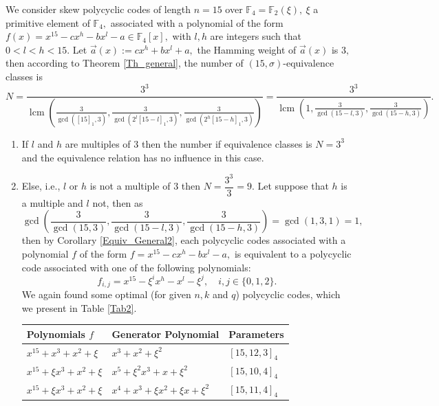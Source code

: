 \documentclass[12pt]{elsarticle}
\DeclareMathOperator{\lcm}{lcm}
\theoremstyle{break}
{\theorembodyfont{\upshape}
    \newtheorem{theorem}{Theorem}[section] %
    \newtheorem{lemma}[theorem]{Lemma} %
    \newtheorem{proposition}[theorem]{Proposition}
    \newtheorem{corollary}[theorem]{Corollary}
    \newtheorem{definition}[theorem]{Definition}
    \newtheorem{example}[theorem]{Example}
    \newtheorem{remark}[theorem]{Remark}
    \newtheorem{conjecture}[theorem]{Conjecture}
    \newtheorem*{proof}{{Proof}}
	\newtheorem*{notation}{Notation}
	\newtheorem*{main}{Cain Theorem}
	\newtheorem*{problem}{Problem}
}
\begin{document}
\begin{example}[Polycyclic codes of length $n=15$ over $\mathbb{F}_4$ ] 

 We consider skew polycyclic  codes of length $n=15$ over $ \mathbb{F}_{4}=\mathbb{F}_2(\xi),\ \xi$ a primitive element of $\mathbb{F}_4,$  associated with  a polynomial of the form $f(x) =x^{15}-cx^h-bx^l-a\in \mathbb{F}_4[x],$ with $l,h$  are integers such that $0<l<h <15$.  Let $\vec{a}(x):=  cx^h+ bx^l+a ,$  the Hamming weight of $ \vec{a}(x) $ is  $3,$ then according to Theorem  \ref{Th_general}, the number of $(15,\sigma)$-equivalence classes is 
 $$ N= \frac{3^3}{ \lcm( \frac{3}{\gcd( [15]_1 ,3)}, \frac{3}{\gcd( 2^l[15-l]_1,3)}, \frac{3}{\gcd( 2^h[15-h]_1,3)} ) }  =
 \frac{3^3}{ \lcm( 1, \frac{3}{\gcd( 15-l,3)}, \frac{3}{\gcd( 15-h,3)} ) } .$$
 \begin{enumerate}
     \item If $l$ and $h$ are multiples of $3$ then the number if equivalence classes is $N=3^3$ and the equivalence relation has no influence in this case.
     \item Else, i.e., $l$  or   $h$ is not a multiple of $3$ then $N=\dfrac{3^3}{ 3}= 9$. Let suppose that $h$ is a multiple and $l$ not, then as  
     $$  \gcd\left( \frac{3}{\gcd( 15 ,3)}, \frac{3}{\gcd( 15-l,3)}, \frac{3}{\gcd( 15-h,3)} \right)= \gcd( 1,3, 1)= 1,$$ then by Corollary \ref{Equiv_General2}, 
 each  polycyclic codes associated with a polynomial $f$ of the form  $f =x^{15}-cx^h-bx^l-a,$ is equivalent to a polycyclic  code  associated with one of the following  polynomials: 
 $$f_{i,j}= x^{15}- \xi^i x^h-  x^l -\xi^j, \quad i,j \in \{0,1, 2\}.  $$
We again found some optimal (for given $n,k$ and $q$) polycyclic codes, which we present in  Table \ref{Tab2}.
 \begin{table}[h]
    \centering
  \small{  \begin{tabular}{|l|l|l|}
        \hline
       \textbf{Polynomials $f$} &  \textbf{Generator Polynomial} &  \textbf{Parameters} \\
        \hline
     $x^{15} + x^3 + x^2 + \xi$ &    $x^3 + x^2 + \xi^2$ &  $[15, 12, 3]_4$ \\
        \hline
       $x^{15} + \xi x^3 + x^2 + \xi$ &  $x^5 + \xi^2 x^3 + x + \xi^2$ &  $[15, 10, 4]_4$ \\
        \hline
        $x^{15} + \xi x^3 + x^2 + \xi$ &  $x^4 + x^3 + \xi x^2 + \xi x + \xi^2$ & $[15, 11, 4]_4$ \\

\end{tabular}}
\end{table}
\end{enumerate}
\end{example}
\end{document}
